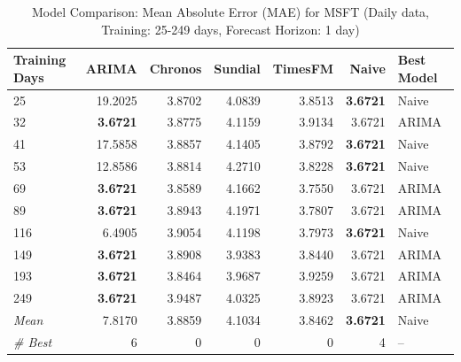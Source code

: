 \begin{table}[htbp]
\centering
\caption{Model Comparison: Mean Absolute Error (MAE) for MSFT (Daily data, Training: 25-249 days, Forecast Horizon: 1 day)}
\label{tab:comparison_MSFT_1d_train-less-year-log_h1_MAE}
\small
\begin{tabular}{lrrrrrl}
\toprule
Training Days & ARIMA & Chronos & Sundial & TimesFM & Naive & Best Model \\
\midrule
25 & 19.2025 & 3.8702 & 4.0839 & 3.8513 & \textbf{3.6721} & Naive \\
32 & \textbf{3.6721} & 3.8775 & 4.1159 & 3.9134 & 3.6721 & ARIMA \\
41 & 17.5858 & 3.8857 & 4.1405 & 3.8792 & \textbf{3.6721} & Naive \\
53 & 12.8586 & 3.8814 & 4.2710 & 3.8228 & \textbf{3.6721} & Naive \\
69 & \textbf{3.6721} & 3.8589 & 4.1662 & 3.7550 & 3.6721 & ARIMA \\
89 & \textbf{3.6721} & 3.8943 & 4.1971 & 3.7807 & 3.6721 & ARIMA \\
116 & 6.4905 & 3.9054 & 4.1198 & 3.7973 & \textbf{3.6721} & Naive \\
149 & \textbf{3.6721} & 3.8908 & 3.9383 & 3.8440 & 3.6721 & ARIMA \\
193 & \textbf{3.6721} & 3.8464 & 3.9687 & 3.9259 & 3.6721 & ARIMA \\
249 & \textbf{3.6721} & 3.9487 & 4.0325 & 3.8923 & 3.6721 & ARIMA \\
\midrule
\textit{Mean} & 7.8170 & 3.8859 & 4.1034 & 3.8462 & \textbf{3.6721} & Naive \\
\textit{\# Best} & 6 & 0 & 0 & 0 & 4 & -- \\
\bottomrule
\end{tabular}
\end{table}